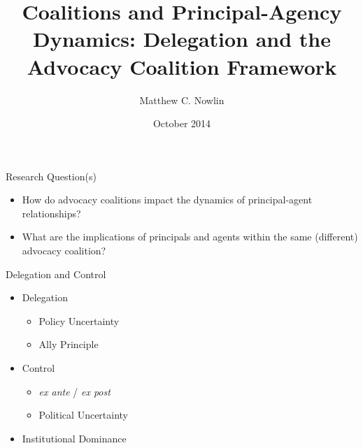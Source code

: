 \documentclass{beamer}
\title{Coalitions and Principal-Agency Dynamics: Delegation and the Advocacy
Coalition Framework}
\author{Matthew C. Nowlin}
\institute
{Department of Political Science \\
College of Charleston \\
\url{nowlinmc@cofc.edu}}
\date{October 2014}
\begin{document}
  \titlepage

\begin{frame}{Research Question(s)}

\begin{itemize}
\itemsep1pt\parskip0pt
\item
  How do advocacy coalitions impact the dynamics of principal-agent
  relationships?
\end{itemize}

\vspace{0.25in}

\begin{itemize}
\itemsep1pt\parskip0pt
\item
  What are the implications of principals and agents within the same
  (different) advocacy coalition?
\end{itemize}

\end{frame}

\begin{frame}{Delegation and Control}

\begin{itemize}
\itemsep1pt\parskip0pt
\item
  Delegation

  \begin{itemize}
  \itemsep1pt\parskip0pt
  \item
    Policy Uncertainty
  \item
    Ally Principle
  \end{itemize}
\end{itemize}

\vspace{0.25in}

\begin{itemize}
\itemsep1pt\parskip0pt
\item
  Control

  \begin{itemize}
  \itemsep1pt\parskip0pt
  \item
    \emph{ex ante} / \emph{ex post}
  \item
    Political Uncertainty
  \end{itemize}
\end{itemize}

\vspace{0.25in}

\begin{itemize}
\itemsep1pt\parskip0pt
\item
  Institutional Dominance
\end{itemize}

\end{frame}
\end{document}
